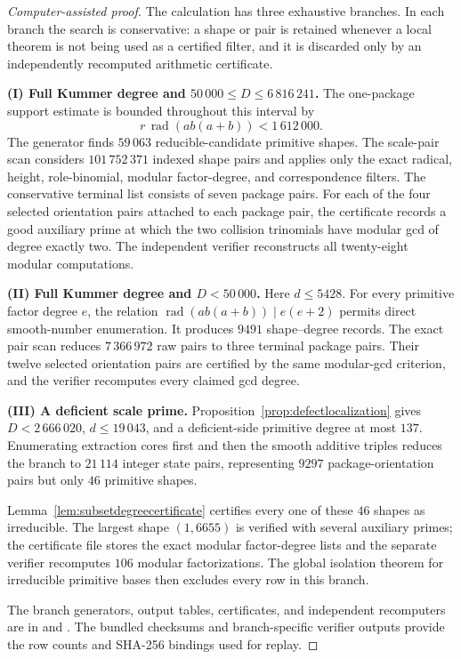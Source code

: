 \documentclass[11pt]{article}
\theoremstyle{definition}
\begin{document}
\begin{proof}[Computer-assisted proof]
The calculation has three exhaustive branches.  In each branch the search is
conservative: a shape or pair is retained whenever a local theorem is not
being used as a certified filter, and it is discarded only by an independently
recomputed arithmetic certificate.

\smallskip
\noindent\textbf{(I) Full Kummer degree and \(50\,000\leq D\leq6\,816\,241\).}
The one-package support estimate is bounded throughout this interval by
\[
 r\,\operatorname{rad}(ab(a+b))<1\,612\,000.
\]
The generator finds \(59\,063\) reducible-candidate primitive shapes.  The
scale-pair scan considers \(101\,752\,371\) indexed shape pairs and applies
only the exact radical, height, role-binomial, modular factor-degree, and
correspondence filters.  The conservative terminal list consists of seven
package pairs.  For each of the four selected orientation pairs attached to
each package pair, the certificate records a good auxiliary prime at which the
two collision trinomials have modular gcd of degree exactly two.  The
independent verifier reconstructs all twenty-eight modular computations.

\smallskip
\noindent\textbf{(II) Full Kummer degree and \(D<50\,000\).}
Here \(d\leq5428\).  For every primitive factor degree \(e\), the relation
\(\operatorname{rad}(ab(a+b))\mid e(e+2)\) permits direct smooth-number
enumeration.  It produces \(9491\) shape--degree records.  The exact pair scan
reduces \(7\,366\,972\) raw pairs to three terminal package pairs.  Their
twelve selected orientation pairs are certified by the same modular-gcd
criterion, and the verifier recomputes every claimed gcd degree.

\smallskip
\noindent\textbf{(III) A deficient scale prime.}
Proposition~\ref{prop:defectlocalization} gives
\(D<2\,666\,020\), \(d\leq19\,043\), and a deficient-side primitive degree
at most \(137\).  Enumerating extraction cores first and then the smooth
additive triples reduces the branch to \(21\,114\) integer state pairs,
representing \(9297\) package-orientation pairs but only \(46\) primitive
shapes.

Lemma~\ref{lem:subsetdegreecertificate} certifies every one of these
\(46\) shapes as irreducible.  The largest shape \((1,6655)\) is verified
with several auxiliary primes; the certificate file stores the exact modular
factor-degree lists and the separate verifier recomputes \(106\) modular
factorizations.  The global isolation theorem for irreducible primitive bases
then excludes every row in this branch.

The branch generators, output tables, certificates, and independent
recomputers are in  and .  The bundled
checksums and branch-specific verifier outputs provide the row counts and
SHA-256 bindings used for replay.
\end{proof}
\end{document}
